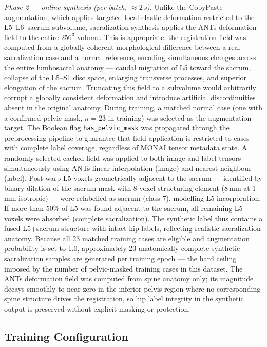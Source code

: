 \documentclass{article}
\begin{document}
\textit{Phase 2 --- online synthesis (per-batch, ${\approx}2$\,s).}
Unlike the CopyPaste augmentation, which applies targeted local elastic
deformation restricted to the L5--L6--sacrum subvolume, sacralization synthesis
applies the ANTs deformation field to the entire $256^3$ volume. This is
appropriate: the registration field was computed from a globally coherent
morphological difference between a real sacralization case and a normal reference,
encoding simultaneous changes across the entire lumbosacral anatomy --- caudal
migration of L5 toward the sacrum, collapse of the L5--S1 disc space, enlarging
transverse processes, and superior elongation of the sacrum. Truncating this field to a subvolume would arbitrarily corrupt a globally
consistent deformation and introduce artificial discontinuities absent in the
original anatomy.
During training, a matched normal case (one with a confirmed pelvic mask,
$n{=}23$ in training) was selected as the augmentation target. The Boolean
flag \texttt{has\_pelvic\_mask} was propagated through the preprocessing
pipeline to guarantee that field application is restricted to cases with
complete label coverage, regardless of MONAI tensor metadata state. A randomly
selected cached field was applied to both image and label tensors simultaneously
using ANTs linear interpolation (image) and nearest-neighbour (label). Post-warp
L5 voxels geometrically adjacent to the sacrum --- identified by binary dilation
of the sacrum mask with 8-voxel structuring element (8\,mm at 1\,mm isotropic)
--- were relabelled as sacrum (class 7), modelling L5 incorporation. If more
than 50\% of L5 was found adjacent to the sacrum, all remaining L5 voxels were
absorbed (complete sacralization). The synthetic label thus contains a fused
L5+sacrum structure with intact hip labels, reflecting realistic sacralization
anatomy. Because all 23 matched training cases are eligible and augmentation
probability is set to 1.0, approximately 23 anatomically complete synthetic
sacralization samples are generated per training epoch --- the hard ceiling
imposed by the number of pelvic-masked training cases in this dataset.
The ANTs deformation field was computed from spine anatomy only; its
magnitude decays smoothly to near-zero in the inferior pelvis region
where no corresponding spine structure drives the registration, so hip
label integrity in the synthetic output is preserved without explicit
masking or protection.

\subsection{Training Configuration}
\end{document}
